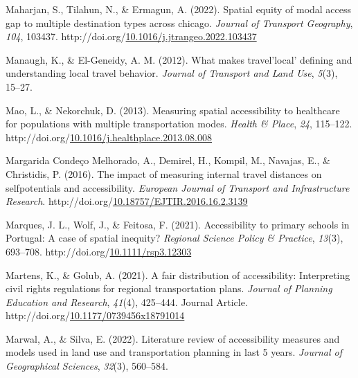 \documentclass[
11pt, %
oneside, %
english, %
singlespacing, %
]{macthesis} %
\newlength{\cslhangindent}
\newenvironment{CSLReferences}[2] %
{\begin{list}{}{%
	\setlength{\itemindent}{0pt}
	\setlength{\leftmargin}{0pt}
	\setlength{\parsep}{0pt}
	\ifodd #1
	\setlength{\leftmargin}{\cslhangindent}
	\setlength{\itemindent}{-1\cslhangindent}
	\fi
	\setlength{\itemsep}{#2\baselineskip}}}
{\end{list}}
\begin{document}
\begin{CSLReferences}{1}{0}
Maharjan, S., Tilahun, N., \& Ermagun, A. (2022). Spatial equity of modal access gap to multiple destination types across chicago. \emph{Journal of Transport Geography}, \emph{104}, 103437. http://doi.org/\href{https://doi.org/10.1016/j.jtrangeo.2022.103437}{10.1016/j.jtrangeo.2022.103437}

Manaugh, K., \& El-Geneidy, A. M. (2012). What makes travel'local' defining and understanding local travel behavior. \emph{Journal of Transport and Land Use}, \emph{5}(3), 15--27.

Mao, L., \& Nekorchuk, D. (2013). Measuring spatial accessibility to healthcare for populations with multiple transportation modes. \emph{Health \& Place}, \emph{24}, 115--122. http://doi.org/\href{https://doi.org/10.1016/j.healthplace.2013.08.008}{10.1016/j.healthplace.2013.08.008}

Margarida Condeço Melhorado, A., Demirel, H., Kompil, M., Navajas, E., \& Christidis, P. (2016). The impact of measuring internal travel distances on selfpotentials and accessibility. \emph{European Journal of Transport and Infrastructure Research}. http://doi.org/\href{https://doi.org/10.18757/EJTIR.2016.16.2.3139}{10.18757/EJTIR.2016.16.2.3139}

Marques, J. L., Wolf, J., \& Feitosa, F. (2021). Accessibility to primary schools in {Portugal}: A case of spatial inequity? \emph{Regional Science Policy \& Practice}, \emph{13}(3), 693--708. http://doi.org/\href{https://doi.org/10.1111/rsp3.12303}{10.1111/rsp3.12303}

Martens, K., \& Golub, A. (2021). A fair distribution of accessibility: Interpreting civil rights regulations for regional transportation plans. \emph{Journal of Planning Education and Research}, \emph{41}(4), 425--444. Journal Article. http://doi.org/\href{https://doi.org/10.1177/0739456x18791014}{10.1177/0739456x18791014}

Marwal, A., \& Silva, E. (2022). Literature review of accessibility measures and models used in land use and transportation planning in last 5 years. \emph{Journal of Geographical Sciences}, \emph{32}(3), 560--584.


\end{CSLReferences}
\end{document}
